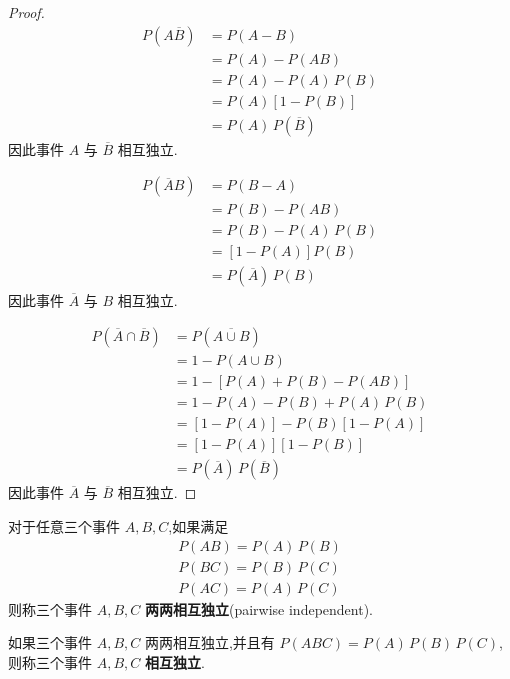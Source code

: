 \begin{proof}
    $$
    \begin{aligned}
        P(A \overline{B}) &= P(A-B) \\
        &= P(A) - P(AB) \\
        &= P(A) - P(A) \, P(B)\\
        &= P(A)[1-P(B)]\\
        &= P(A) \, P(\overline{B})
    \end{aligned}
    $$
    因此事件 $A$ 与 $\overline{B}$ 相互独立.

    $$
    \begin{aligned}
        P(\overline{A} B) &= P(B-A) \\
        &= P(B) - P(AB) \\
        &= P(B) - P(A) \, P(B) \\
        &= [1-P(A)] P(B) \\
        &= P(\overline{A}) \, P(B)
    \end{aligned}
    $$
    因此事件 $\overline{A}$ 与 $B$ 相互独立.

    $$
    \begin{aligned}
        P(\overline{A} \cap \overline{B}) &= P(\overline{A \cup B}) \\
        &= 1 - P(A \cup B) \\
        &= 1 - [P(A) + P(B) - P(AB)] \\
        &= 1 - P(A) - P(B) + P(A) \, P(B) \\
        &= [1-P(A)] - P(B) [1-P(A)] \\
        &= [1-P(A)][1-P(B)] \\
        &= P(\overline{A}) \, P(\overline{B})
    \end{aligned}
    $$
    因此事件 $\overline{A}$ 与 $\overline{B}$ 相互独立.
\end{proof}

\begin{definition}
    \indent 对于任意三个事件 $A,B,C$,如果满足
    \begin{gather*}
        P(AB) = P(A) \, P(B) \\
        P(BC) = P(B) \, P(C) \\
        P(AC) = P(A) \, P(C)
    \end{gather*}
    则称三个事件 $A,B,C$ \textbf{两两相互独立}(pairwise independent).
\end{definition}

\begin{definition}
    \indent 如果三个事件 $A,B,C$ 两两相互独立,并且有 $P(ABC)=P(A)\,P(B)\,P(C)$,则称三个事件 $A,B,C$ \textbf{相互独立}.
\end{definition}


